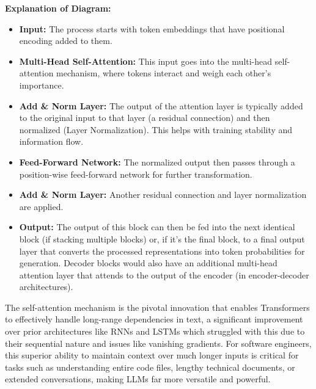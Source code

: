 \textbf{Explanation of Diagram:}
\begin{itemize}
    \item \textbf{Input:} The process starts with token embeddings that have positional encoding added to them.
    \item \textbf{Multi-Head Self-Attention:} This input goes into the multi-head self-attention mechanism, where tokens interact and weigh each other's importance.
    \item \textbf{Add \& Norm Layer:} The output of the attention layer is typically added to the original input to that layer (a residual connection) 
    and then normalized (Layer Normalization). This helps with training stability and information flow.
    \item \textbf{Feed-Forward Network:} The normalized output then passes through a position-wise feed-forward network for further transformation.
    \item \textbf{Add \& Norm Layer:} Another residual connection and layer normalization are applied.
    \item \textbf{Output:} The output of this block can then be fed into the next identical block (if stacking multiple blocks) or, if it's the final block, 
    to a final output layer that converts the processed representations into token probabilities for generation. Decoder blocks would also have an additional 
    multi-head attention layer that attends to the output of the encoder (in encoder-decoder architectures).
\end{itemize}

The self-attention mechanism is the pivotal innovation that enables Transformers to effectively handle long-range dependencies in text, a significant 
improvement over prior architectures like RNNs and LSTMs which struggled with this due to their sequential nature and issues like vanishing gradients. 
For software engineers, this superior ability to maintain context over much longer inputs is critical for tasks such as understanding entire code files, 
lengthy technical documents, or extended conversations, making LLMs far more versatile and powerful. 